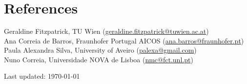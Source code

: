 \documentclass[11pt, a4paper]{article} %
\begin{document}
\section*{References}

Geraldine Fitzpatrick, TU Wien (\href{mailto:geraldine.fitzpatrick@tuwien.ac.at}{geraldine.fitzpatrick@tuwien.ac.at})\\
Ana Correia de Barros, Fraunhofer Portugal AICOS
(\href{mailto:ana.barros@fraunhofer.pt}{ana.barros@fraunhofer.pt})\\
Paula Alexandra Silva, University of Aveiro (\href{mailto:palexa@gmail.com}{palexa@gmail.com})\\
Nuno Correia, Universidade NOVA de Lisboa (\href{mailto:nmc@fct.unl.pt}{nmc@fct.unl.pt})\\





\begin{center}
{\scriptsize Last updated: \today\ } %
\end{center}

\end{document}
